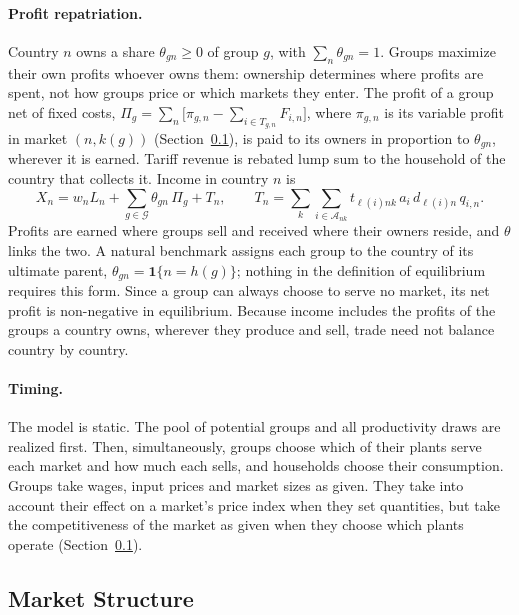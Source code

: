 \documentclass[11pt]{article}
\theoremstyle{definition}
\theoremstyle{remark}
\newcommand{\cG}{\mathcal G}
\newcommand{\cA}{\mathcal A}
\begin{document}
\paragraph{Profit repatriation.} Country $n$ owns a share $\theta_{gn}\ge0$ of group
$g$, with $\sum_n\theta_{gn}=1$. Groups maximize their own profits whoever owns them:
ownership determines where profits are spent, not how groups price or which markets
they enter. The profit of a group net of fixed costs,
$\Pi_g=\sum_n\bigl[\pi_{g,n}-\sum_{i\in T_{g,n}}F_{i,n}\bigr]$, where $\pi_{g,n}$ is
its variable profit in market $(n,k(g))$ (Section~\ref{sec:market}), is paid to its
owners in proportion to $\theta_{gn}$, wherever it is earned. Tariff revenue is rebated
lump sum to the household of the country that collects it. Income in country $n$ is
\begin{equation}
  X_n=w_nL_n+\sum_{g\in\cG}\theta_{gn}\,\Pi_g+T_n,
  \qquad
  T_n=\sum_{k}\sum_{i\in\cA_{nk}}t_{\ell(i)nk}\,a_i\,d_{\ell(i)n}\,q_{i,n}.
  \label{eq:income}
\end{equation}
Profits are earned where groups sell and received where their owners reside, and
$\theta$ links the two. A natural benchmark assigns each group to the
country of its ultimate parent, $\theta_{gn}=\mathbf 1\{n=h(g)\}$; nothing in the
definition of equilibrium requires this form. Since a group can always choose to serve
no market, its net profit is non-negative in equilibrium. Because income includes the
profits of the groups a country owns, wherever they produce and sell, trade need not
balance country by country.

\paragraph{Timing.} The model is static. The pool of potential groups and all
productivity draws are realized first. Then, simultaneously, groups choose which of
their plants serve each market and how much each sells, and households choose their
consumption. Groups take wages, input prices and market sizes as given. They take into
account their effect on a market's price index when they set quantities, but take the
competitiveness of the market as given when they choose which plants operate
(Section~\ref{sec:market}).

\subsection{Market Structure}
\label{sec:market}
\end{document}
